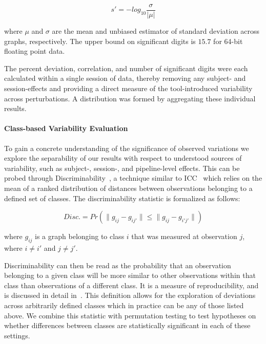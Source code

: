 \documentclass[fleqn,10pt]{SelfArx} %
\begin{document}
\begin{equation}
s' = -log_{10}\frac{\sigma}{\lvert\mu\rvert}
\label{eq:sigdig}
\end{equation}

where $\mu$ and $\sigma$ are the mean and unbiased estimator of standard deviation across graphs, respectively. The
upper bound on significant digits is $15.7$ for 64-bit floating point data.

The percent deviation, correlation, and number of significant digits were each calculated within a single session of
data, thereby removing any subject- and session-effects and providing a direct measure of the tool-introduced
variability across perturbations. A distribution was formed by aggregating these individual results.

\paragraph{Class-based Variability Evaluation} To gain a concrete understanding of the significance of observed
variations we explore the separability of our results with respect to understood sources of variability, such as 
subject-, session-, and pipeline-level effects. This can be probed through Discriminability~\cite{bridgeford2020elim},
a technique similar to ICC~\cite{Bartko1966-tl} which relies on the mean of a ranked distribution of distances between
observations belonging to a defined set of classes. The discriminability statistic is formalized as follows:

\begin{equation}
Disc. = Pr(\lVert g_{ij} - g_{ij'} \rVert \leq \lVert g_{ij} - g_{i'j'} \rVert)
\label{eq:sigdig}
\end{equation}

where $g_{ij}$ is a graph belonging to class $i$ that was measured at observation $j$, where $i \neq i'$ and
$j \neq j'$.

Discriminability can then be read as the probability that an observation belonging to a given class will be more
similar to other observations within that class than observations of a different class. It is a measure of
reproducibility, and is discussed in detail in~\cite{bridgeford2020elim}. This definition allows for the exploration of
deviations across arbitrarily defined classes which in practice can be any of those listed above. We combine this
statistic with permutation testing to test hypotheses on whether differences between classes are statistically
significant in each of these settings.
\end{document}
